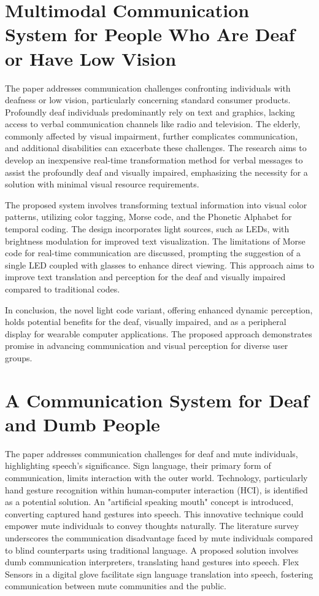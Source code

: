 \documentclass[12pt,a4paper]{report}
\begin{document}
\section{Multimodal Communication System for People Who Are Deaf or Have Low Vision }
The paper\cite{ref5} addresses communication challenges confronting individuals with deafness or low vision, particularly concerning standard consumer products. Profoundly deaf individuals predominantly rely on text and graphics, lacking access to verbal communication channels like radio and television. The elderly, commonly affected by visual impairment, further complicates communication, and additional disabilities can exacerbate these challenges. The research aims to develop an inexpensive real-time transformation method for verbal messages to assist the profoundly deaf and visually impaired, emphasizing the necessity for a solution with minimal visual resource requirements.

The proposed system involves transforming textual information into visual color patterns, utilizing color tagging, Morse code, and the Phonetic Alphabet for temporal coding. The design incorporates light sources, such as LEDs, with brightness modulation for improved text visualization. The limitations of Morse code for real-time communication are discussed, prompting the suggestion of a single LED coupled with glasses to enhance direct viewing. This approach aims to improve text translation and perception for the deaf and visually impaired compared to traditional codes.

In conclusion, the novel light code variant, offering enhanced dynamic perception, holds potential benefits for the deaf, visually impaired, and as a peripheral display for wearable computer applications. The proposed approach demonstrates promise in advancing communication and visual perception for diverse user groups.

\section{A Communication System for Deaf and Dumb People }
The paper\cite{ref6} addresses communication challenges for deaf and mute individuals, highlighting speech's significance. Sign language, their primary form of communication, limits interaction with the outer world. Technology, particularly hand gesture recognition within human-computer interaction (HCI), is identified as a potential solution. An "artificial speaking mouth" concept is introduced, converting captured hand gestures into speech. This innovative technique could empower mute individuals to convey thoughts naturally. The literature survey underscores the communication disadvantage faced by mute individuals compared to blind counterparts using traditional language. A proposed solution involves dumb communication interpreters, translating hand gestures into speech. Flex Sensors in a digital glove facilitate sign language translation into speech, fostering communication between mute communities and the public.
\end{document}
